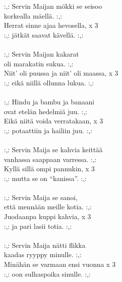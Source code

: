             :,: Servin Maijan mökki se seisoo \\
            korkealla mäellä. :,: \\
            Herrat sinne ajaa hevosella,  x 3 \\
            :,: jätkät saavat kävellä. :,: \\
\hspace{10mm} \\
            :,: Servin Maijan kakarat \\
            oli marakatin sukua. :,: \\
            Niit' oli puussa ja niit' oli maassa,  x 3 \\
            :,: eikä niillä ollunna lukua. :,: \\
\hspace{10mm} \\
            :,: Hindu ja bambu ja banaani \\
            ovat etelän hedelmiä juu. :,: \\
            Eikä niitä voida verratakaan,  x 3 \\
            :,: potaattiin ja hailiin juu. :,: \\
\hspace{10mm} \\
            :,: Servin Maija se kahvia keittää \\
            vanhassa saappaan varressa. :,: \\
            Kyllä sillä ompi pannukin,  x 3 \\
            :,: mutta se on “kanissa”. :,: \\
\hspace{10mm} \\
            :,: Servin Maija se sanoi, \\
            että mennään meille kotia. :,: \\
            Juodaanpa kuppi kahvia,  x 3 \\
            :,: ja pari lasii totia. :,: \\
\hspace{10mm} \\
            :,: Servin Maija nätti flikka \\
            kaadas ryyppy minulle. :,: \\
            Minähän se varmaan ensi vuonna  x 3 \\
            :,: oon sulhaspoika sinulle. :,: \\
\hspace{10mm} \\
